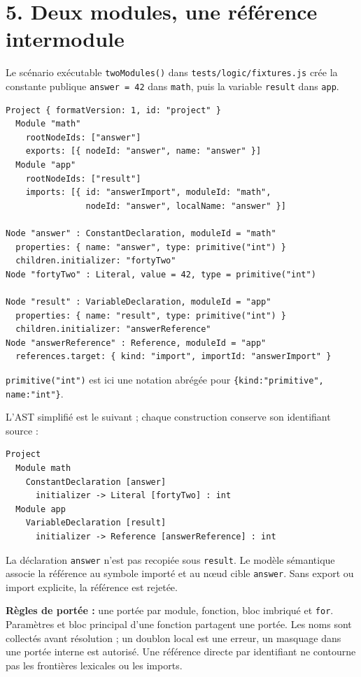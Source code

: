 \documentclass[11pt,a4paper]{article}
\newcommand{\code}[1]{\texttt{#1}}
\newcommand{\chaptertitle}[2]{\noindent{\small\sffamily SAPPHIRE 3 --- FONDATIONS LOGIQUES\hfill #1/4}\par\vspace{4mm}{\LARGE\sffamily\bfseries #2}\par\vspace{3mm}}
\begin{document}
\newpage
\chaptertitle{3}{Exemple et résolution des références}
\section*{5. Deux modules, une référence intermodule}
Le scénario exécutable \code{twoModules()} dans
\code{tests/logic/fixtures.js} crée la constante publique \code{answer = 42}
dans \code{math}, puis la variable \code{result} dans \code{app}.

{\small
\begin{verbatim}
Project { formatVersion: 1, id: "project" }
  Module "math"
    rootNodeIds: ["answer"]
    exports: [{ nodeId: "answer", name: "answer" }]
  Module "app"
    rootNodeIds: ["result"]
    imports: [{ id: "answerImport", moduleId: "math",
                nodeId: "answer", localName: "answer" }]

Node "answer" : ConstantDeclaration, moduleId = "math"
  properties: { name: "answer", type: primitive("int") }
  children.initializer: "fortyTwo"
Node "fortyTwo" : Literal, value = 42, type = primitive("int")

Node "result" : VariableDeclaration, moduleId = "app"
  properties: { name: "result", type: primitive("int") }
  children.initializer: "answerReference"
Node "answerReference" : Reference, moduleId = "app"
  references.target: { kind: "import", importId: "answerImport" }
\end{verbatim}}
\code{primitive("int")} est ici une notation abrégée pour
\code{\{kind:"primitive", name:"int"\}}.

L'AST simplifié est le suivant ; chaque construction conserve son
identifiant source :
{\small
\begin{verbatim}
Project
  Module math
    ConstantDeclaration [answer]
      initializer -> Literal [fortyTwo] : int
  Module app
    VariableDeclaration [result]
      initializer -> Reference [answerReference] : int
\end{verbatim}}
La déclaration \code{answer} n'est pas recopiée sous \code{result}.
Le modèle sémantique associe la référence au symbole importé et au nœud
cible \code{answer}. Sans export ou import explicite, la référence est rejetée.

\textbf{Règles de portée :} une portée par module, fonction, bloc imbriqué et
\code{for}. Paramètres et bloc principal d'une fonction partagent une portée.
Les noms sont collectés avant résolution ; un doublon local est une erreur,
un masquage dans une portée interne est autorisé. Une référence directe par
identifiant ne contourne pas les frontières lexicales ou les imports.
\end{document}
